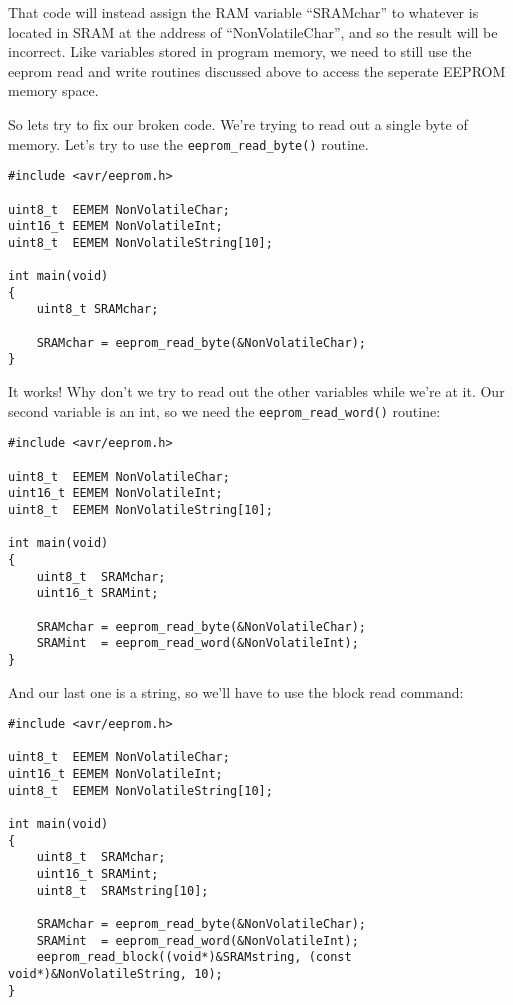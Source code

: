 \documentclass[a4paper,oneside,notitlepage]{book}
\begin{document}
That code will instead assign the RAM variable ``SRAMchar'' to whatever is located in SRAM at the address of ``NonVolatileChar'', and so the result will be incorrect. Like variables stored in program memory, we need to still use the eeprom read and write routines discussed above to access the seperate EEPROM memory space.

So lets try to fix our broken code. We're trying to read out a single byte of memory. Let's try to use the \lstinline{eeprom_read_byte()} routine.

\begin{center}
\begin{lstlisting}
#include <avr/eeprom.h>

uint8_t  EEMEM NonVolatileChar;
uint16_t EEMEM NonVolatileInt;
uint8_t  EEMEM NonVolatileString[10];

int main(void)
{
    uint8_t SRAMchar;

    SRAMchar = eeprom_read_byte(&NonVolatileChar);
}
\end{lstlisting}
\end{center}

It works! Why don't we try to read out the other variables while we're at it. Our second variable is an int, so we need the \lstinline{eeprom_read_word()} routine:

\begin{center}
\begin{lstlisting}
#include <avr/eeprom.h>

uint8_t  EEMEM NonVolatileChar;
uint16_t EEMEM NonVolatileInt;
uint8_t  EEMEM NonVolatileString[10];

int main(void)
{
    uint8_t  SRAMchar;
    uint16_t SRAMint;

    SRAMchar = eeprom_read_byte(&NonVolatileChar);
    SRAMint  = eeprom_read_word(&NonVolatileInt);
}
\end{lstlisting}
\end{center}

And our last one is a string, so we'll have to use the block read command:

\begin{center}
\begin{lstlisting}
#include <avr/eeprom.h>

uint8_t  EEMEM NonVolatileChar;
uint16_t EEMEM NonVolatileInt;
uint8_t  EEMEM NonVolatileString[10];

int main(void)
{
    uint8_t  SRAMchar;
    uint16_t SRAMint;
    uint8_t  SRAMstring[10];   

    SRAMchar = eeprom_read_byte(&NonVolatileChar);
    SRAMint  = eeprom_read_word(&NonVolatileInt);
    eeprom_read_block((void*)&SRAMstring, (const void*)&NonVolatileString, 10);
}
\end{lstlisting}
\end{center}
\end{document}
